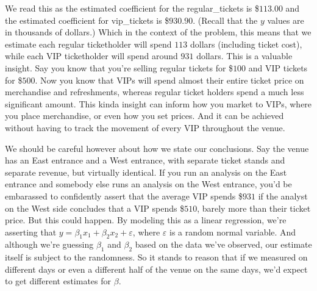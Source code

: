 \documentclass{amsbook}
\begin{document}
We read this as the estimated coefficient for the regular\_tickets is \$$113.00$ and the estimated coefficient for vip\_tickets is \$$930.90$.  (Recall that the $y$ values are in thousands of dollars.)  Which in the context of the problem, this means that we estimate each regular ticketholder will spend $113$ dollars (including ticket cost), while each VIP ticketholder will spend around $931$ dollars.  This is a valuable insight.  Say you know that you're selling regular tickets for \$$100$ and VIP tickets for \$$500$.  Now you know that VIPs will spend almost their entire ticket price on merchandise and refreshments, whereas regular ticket holders spend a much less significant amount.  This kinda insight can inform how you market to VIPs, where you place merchandise, or even how you set prices.  And it can be achieved without having to track the movement of every VIP throughout the venue.

We should be careful however about how we state our conclusions.  Say the venue has an East entrance and a West entrance, with separate ticket stands and separate revenue, but virtually identical.  If you run an analysis on the East entrance and somebody else runs an analysis on the West entrance, you'd be embarassed to confidently assert that the average VIP spends \$$931$ if the analyst on the West side concludes that a VIP spends \$$510$, barely more than their ticket price.  But this could happen.  By modeling this as a linear regression, we're asserting that $y=\beta_1x_1+\beta_2x_2+\varepsilon$, where $\varepsilon$ is a random normal variable.  And although we're guessing $\beta_1$ and $\beta_2$ based on the data we've observed, our estimate itself is subject to the randomness.  So it stands to reason that if we measured on different days or even a different half of the venue on the same days, we'd expect to get different estimates for $\beta$.
\end{document}
